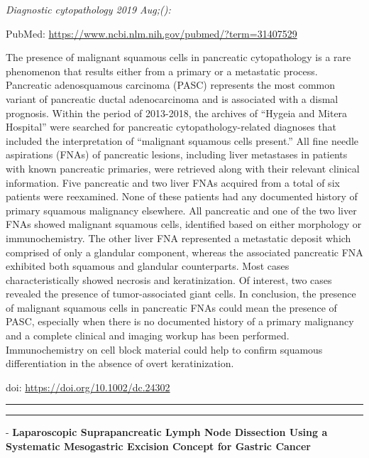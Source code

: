 \documentclass[]{article}
\begin{document}
\emph{Diagnostic cytopathology 2019 Aug;():}

PubMed: \url{https://www.ncbi.nlm.nih.gov/pubmed/?term=31407529}

The presence of malignant squamous cells in pancreatic cytopathology is
a rare phenomenon that results either from a primary or a metastatic
process. Pancreatic adenosquamous carcinoma (PASC) represents the most
common variant of pancreatic ductal adenocarcinoma and is associated
with a dismal prognosis. Within the period of 2013-2018, the archives of
``Hygeia and Mitera Hospital'' were searched for pancreatic
cytopathology-related diagnoses that included the interpretation of
``malignant squamous cells present.'' All fine needle aspirations (FNAs)
of pancreatic lesions, including liver metastases in patients with known
pancreatic primaries, were retrieved along with their relevant clinical
information. Five pancreatic and two liver FNAs acquired from a total of
six patients were reexamined. None of these patients had any documented
history of primary squamous malignancy elsewhere. All pancreatic and one
of the two liver FNAs showed malignant squamous cells, identified based
on either morphology or immunochemistry. The other liver FNA represented
a metastatic deposit which comprised of only a glandular component,
whereas the associated pancreatic FNA exhibited both squamous and
glandular counterparts. Most cases characteristically showed necrosis
and keratinization. Of interest, two cases revealed the presence of
tumor-associated giant cells. In conclusion, the presence of malignant
squamous cells in pancreatic FNAs could mean the presence of PASC,
especially when there is no documented history of a primary malignancy
and a complete clinical and imaging workup has been performed.
Immunochemistry on cell block material could help to confirm squamous
differentiation in the absence of overt keratinization.

doi: \url{https://doi.org/10.1002/dc.24302}

{}

{}

\begin{center}\rule{0.5\linewidth}{\linethickness}\end{center}

\begin{center}\rule{0.5\linewidth}{\linethickness}\end{center}

 - \textbf{Laparoscopic Suprapancreatic Lymph Node Dissection Using a
Systematic Mesogastric Excision Concept for Gastric Cancer}
\end{document}
